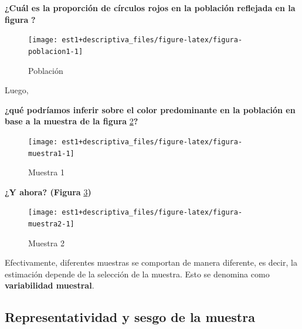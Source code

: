 \documentclass[
  11pt,
]{book}
\theoremstyle{definition}
\theoremstyle{definition}
\theoremstyle{definition}
\theoremstyle{definition}
\theoremstyle{remark}
\begin{document}
\textbf{¿Cuál es la proporción de círculos rojos en la población reflejada en la figura} \textbf{?}

\begin{figure}

{\centering \texttt{[image: est1+descriptiva\_files/figure-latex/figura-poblacion1-1]} 

}

\caption{Población}\label{fig:figura-poblacion1}
\end{figure}

Luego,

\textbf{¿qué podríamos inferir sobre el color predominante en la población en base a la muestra de la figura} \ref{fig:figura-muestra1}\textbf{?}

\begin{figure}

{\centering \texttt{[image: est1+descriptiva\_files/figure-latex/figura-muestra1-1]} 

}

\caption{Muestra 1}\label{fig:figura-muestra1}
\end{figure}

\textbf{¿Y ahora? (Figura} \ref{fig:figura-muestra2}\textbf{)}

\begin{figure}

{\centering \texttt{[image: est1+descriptiva\_files/figure-latex/figura-muestra2-1]} 

}

\caption{Muestra 2}\label{fig:figura-muestra2}
\end{figure}

Efectivamente, diferentes muestras se comportan de manera diferente, es decir, la estimación depende de la selección de la muestra. Esto se denomina como \textbf{variabilidad muestral}.

\subsection{Representatividad y sesgo de la muestra}\label{representatividad-y-sesgo-de-la-muestra}
\end{document}
